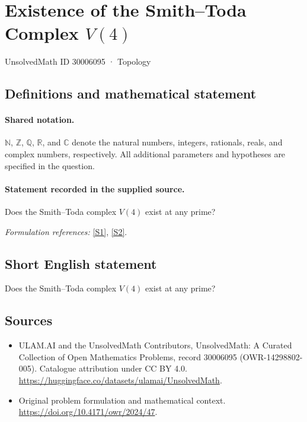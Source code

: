\documentclass[11pt]{article}
\newcommand{\sref}[2]{\hyperlink{source:#1:#2}{[S#2]}}
\begin{document}
\setcounter{section}{30006094}
\section{\texorpdfstring{Existence of the Smith–Toda Complex $V(4)$}{Existence of the Smith–Toda Complex V(4)}}\label{30006095}
{\small UnsolvedMath ID 30006095 · Topology}
\subsection{Definitions and mathematical statement}

\paragraph{Shared notation.}$\mathbb N$, $\mathbb Z$, $\mathbb Q$, $\mathbb R$, and $\mathbb C$ denote the natural numbers, integers, rationals, reals, and complex numbers, respectively. All additional parameters and hypotheses are specified in the question.


\paragraph{Statement recorded in the supplied source.}
Does the Smith–Toda complex $V(4)$ exist at any prime?
\par\smallskip\textit{Formulation references:} \sref{30006095}{1}, \sref{30006095}{2}.
\subsection{Short English statement}
Does the Smith–Toda complex $V(4)$ exist at any prime?
\subsection{Sources}
\begin{itemize}
\item[\hypertarget{source:30006095:1}{S1}] ULAM.AI and the UnsolvedMath Contributors, UnsolvedMath: A Curated Collection of Open Mathematics Problems, record 30006095 (OWR-14298802-005). Catalogue attribution under CC BY 4.0.
\url{https://huggingface.co/datasets/ulamai/UnsolvedMath}.
\item[\hypertarget{source:30006095:2}{S2}] Original problem formulation and mathematical context.
\url{https://doi.org/10.4171/owr/2024/47}.
\end{itemize}
\label{end:30006095}
\end{document}
